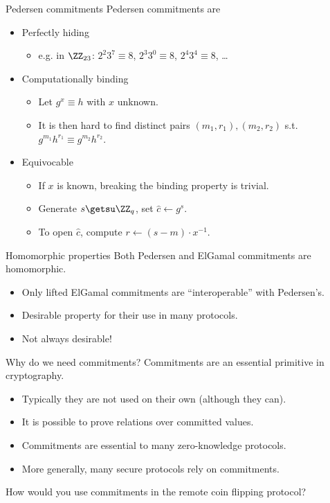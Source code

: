 \begin{frame}{Pedersen commitments}
  Pedersen commitments are
  \begin{itemize}[<+(1)->]
    \item Perfectly hiding
    \begin{itemize}
      \item e.g. in $\ZZ_{23}$: $2^2 3^7 \equiv 8$, $2^3 3^0 \equiv 8$, $2^4 3^4 \equiv 8$, \dots
    \end{itemize}
    \item Computationally binding
    \begin{itemize}
      \item Let $g^x \equiv h$ with $x$ unknown.
      \item It is then hard to find distinct pairs $(m_1, r_1), (m_2, r_2)$ s.t. $g^{m_1} h^{r_1} \equiv g^{m_2} h^{r_2}$. 
    \end{itemize}
    \item Equivocable
    \begin{itemize}
      \item If $x$ is known, breaking the binding property is trivial.
      \item Generate $s \getsu \ZZ_{q}$, set $\hat{c} \gets g^s$.
      \item To open $\hat{c}$, compute $r \gets (s-m)\cdot x^{-1}$.
    \end{itemize}
  \end{itemize}
\end{frame}

\begin{frame}{Homomorphic properties}
  Both Pedersen and ElGamal commitments are homomorphic.
  \begin{itemize}[<+(1)->]
    \item Only lifted ElGamal commitments are \enquote{interoperable} with Pedersen's.
    \item Desirable property for their use in many protocols.
    \item Not always desirable!
  \end{itemize}
\end{frame}

\begin{frame}{Why do we need commitments?}
  Commitments are an essential primitive in cryptography.
  \begin{itemize}[<+(1)->]
    \item Typically they are not used on their own (although they can).
    \item It is possible to prove relations over committed values.
    \item Commitments are essential to many zero-knowledge protocols.
    \item More generally, many secure protocols rely on commitments.
  \end{itemize}

  \vspace*{1em}

  \pause
  How would you use commitments in the remote coin flipping protocol?
\end{frame}

